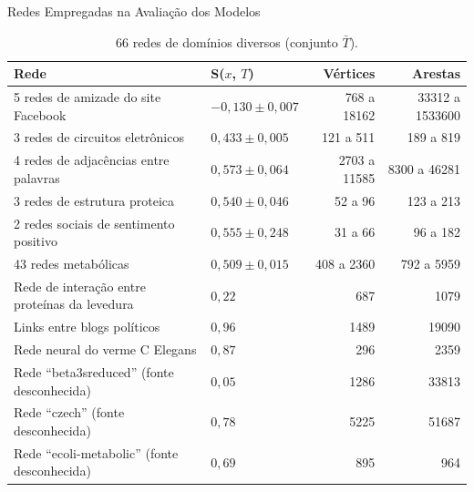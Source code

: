 \begin{chapter}{Redes Empregadas na Avaliação dos Modelos}
\begin{center}
\begin{longtable}{| p{6cm} | l | r | r | }
	\caption{66 redes de domínios diversos (conjunto $\bar{T}$).} \\
	\hline
	\textbf{Rede} & \textbf{S($x$, $T$)} & \textbf{Vértices} & \textbf{Arestas} \\ \hline
	\hline
	5 redes de amizade do site Facebook \cite{Traud2008} & $-0,130 \pm 0,007$ & 768 a 18162 & 33312 a 1533600 \\ \hline
	3 redes de circuitos eletrônicos \cite{Milo2004} & $0,433 \pm 0,005$ & 121 a 511 & 189 a 819 \\ \hline
	4 redes de adjacências entre palavras \cite{Milo2004} & $0,573 \pm 0,064$ & 2703 a 11585 & 8300 a 46281 \\ \hline
	3 redes de estrutura proteica \cite{Milo2004} & $0,540 \pm 0,046$ & 52 a 96 & 123 a 213 \\ \hline
	2 redes sociais de sentimento positivo \cite{Milo2004} & $0,555 \pm 0,248$ & 31 a 66 & 96 a 182 \\ \hline
	43 redes metabólicas \cite{Jeong2000} & $0,509 \pm 0,015$ & 408 a 2360 & 792 a 5959 \\ \hline
	Rede de interação entre proteínas da levedura \cite{Jeong2001} & $0,22$ & 687 & 1079 \\ \hline
	Links entre blogs políticos \cite{Adamic2005} & $0,96$ & 1489 & 19090 \\ \hline
	Rede neural do verme C Elegans \cite{Watts1998} & $0,87$ & 296 & 2359 \\ \hline
	Rede ``beta3sreduced'' (fonte desconhecida) & $0,05$ & 1286 & 33813 \\ \hline
	Rede ``czech'' (fonte desconhecida) & $0,78$ & 5225 & 51687 \\  \hline
	Rede ``ecoli-metabolic'' (fonte desconhecida) & $0,69$ & 895 & 964 \\ \hline
	
\end{longtable}
\end{center}

\end{chapter}

